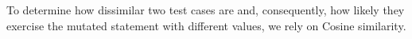 {%
%
%
To determine how dissimilar two test cases are and, consequently, how likely they exercise the mutated statement with different values, we rely on Cosine similarity.
%
%
}
